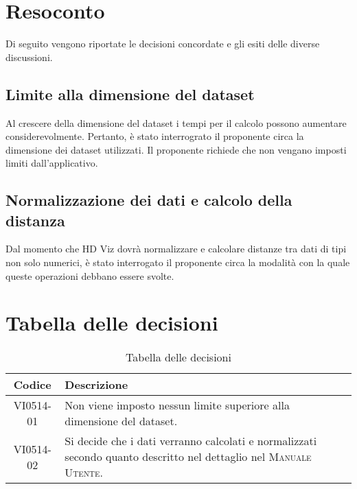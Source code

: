 \documentclass{article}
\begin{document}
\section{Resoconto}
\label{sec:resoconto}

Di seguito vengono riportate le decisioni concordate e gli esiti delle diverse discussioni.

\subsection{Limite alla dimensione del dataset}
\label{itm:1}

Al crescere della dimensione del dataset i tempi per il calcolo possono aumentare considerevolmente. Pertanto, è stato interrograto il proponente circa la dimensione dei dataset utilizzati. Il proponente richiede che non vengano imposti limiti dall'applicativo.

\subsection{Normalizzazione dei dati e calcolo della distanza}
\label{itm:2}
Dal momento che HD Viz dovrà normalizzare e calcolare distanze tra dati di tipi non solo numerici, è stato interrogato il proponente circa la modalità con la quale queste operazioni debbano essere svolte.


\section{Tabella delle decisioni}%
\label{sub:decisioni}

\begin{table}[!ht]
	\centering
	\begin{tabular}{|c|p{13cm}|}
		\hline
		\rowcolor{lightgray}
		\textbf{Codice} & \textbf{Descrizione} \\
		\hline
			VI0514-01 & Non viene imposto nessun limite superiore alla dimensione del dataset. \\
            VI0514-02 & Si decide che i dati verranno calcolati e normalizzati secondo quanto descritto nel dettaglio nel \textsc{Manuale Utente}. \\
		\hline
	\end{tabular}
	\caption{Tabella delle decisioni}
\end{table}
\end{document}
